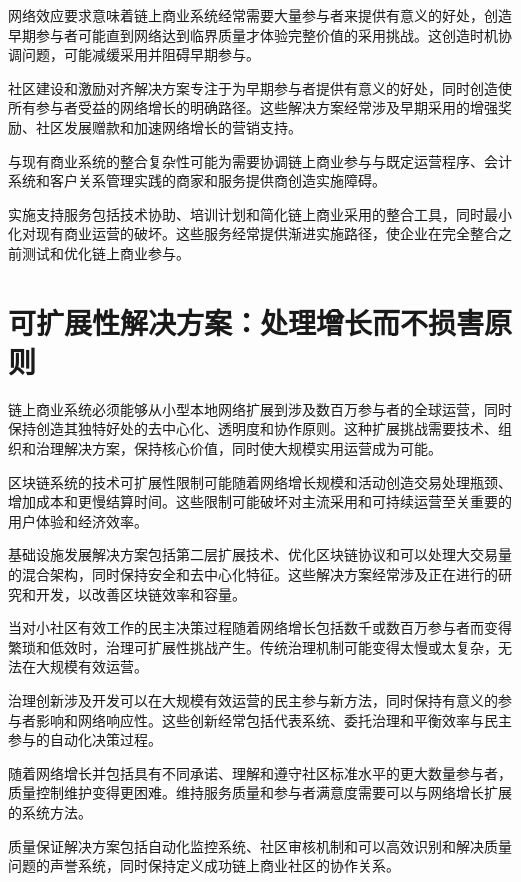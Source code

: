 \documentclass[
  Letterpaper,
]{scrbook}
\begin{document}
网络效应要求意味着链上商业系统经常需要大量参与者来提供有意义的好处，创造早期参与者可能直到网络达到临界质量才体验完整价值的采用挑战。这创造时机协调问题，可能减缓采用并阻碍早期参与。

社区建设和激励对齐解决方案专注于为早期参与者提供有意义的好处，同时创造使所有参与者受益的网络增长的明确路径。这些解决方案经常涉及早期采用的增强奖励、社区发展赠款和加速网络增长的营销支持。

与现有商业系统的整合复杂性可能为需要协调链上商业参与与既定运营程序、会计系统和客户关系管理实践的商家和服务提供商创造实施障碍。

实施支持服务包括技术协助、培训计划和简化链上商业采用的整合工具，同时最小化对现有商业运营的破坏。这些服务经常提供渐进实施路径，使企业在完全整合之前测试和优化链上商业参与。

\section{可扩展性解决方案：处理增长而不损害原则}\label{ux53efux6269ux5c55ux6027ux89e3ux51b3ux65b9ux6848ux5904ux7406ux589eux957fux800cux4e0dux635fux5bb3ux539fux5219}

链上商业系统必须能够从小型本地网络扩展到涉及数百万参与者的全球运营，同时保持创造其独特好处的去中心化、透明度和协作原则。这种扩展挑战需要技术、组织和治理解决方案，保持核心价值，同时使大规模实用运营成为可能。

区块链系统的技术可扩展性限制可能随着网络增长规模和活动创造交易处理瓶颈、增加成本和更慢结算时间。这些限制可能破坏对主流采用和可持续运营至关重要的用户体验和经济效率。

基础设施发展解决方案包括第二层扩展技术、优化区块链协议和可以处理大交易量的混合架构，同时保持安全和去中心化特征。这些解决方案经常涉及正在进行的研究和开发，以改善区块链效率和容量。

当对小社区有效工作的民主决策过程随着网络增长包括数千或数百万参与者而变得繁琐和低效时，治理可扩展性挑战产生。传统治理机制可能变得太慢或太复杂，无法在大规模有效运营。

治理创新涉及开发可以在大规模有效运营的民主参与新方法，同时保持有意义的参与者影响和网络响应性。这些创新经常包括代表系统、委托治理和平衡效率与民主参与的自动化决策过程。

随着网络增长并包括具有不同承诺、理解和遵守社区标准水平的更大数量参与者，质量控制维护变得更困难。维持服务质量和参与者满意度需要可以与网络增长扩展的系统方法。

质量保证解决方案包括自动化监控系统、社区审核机制和可以高效识别和解决质量问题的声誉系统，同时保持定义成功链上商业社区的协作关系。
\end{document}
